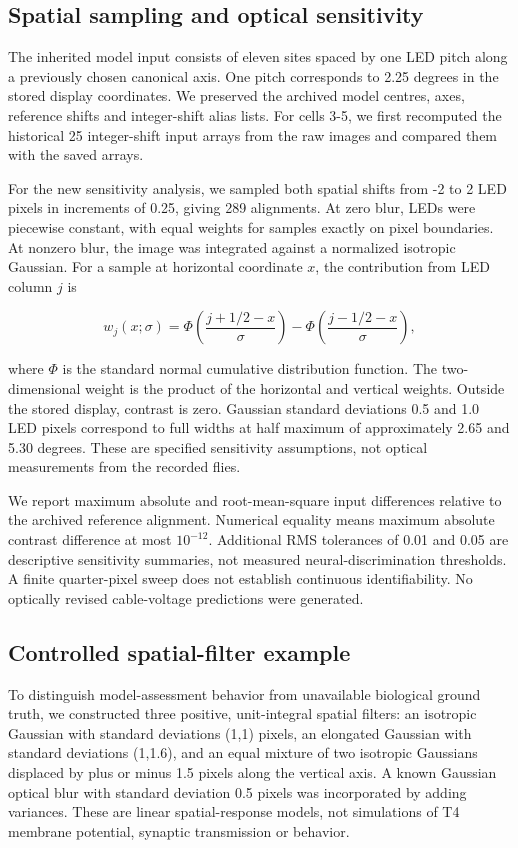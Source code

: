 \documentclass[11pt,letterpaper]{article}
\begin{document}
\subsection{Spatial sampling and optical sensitivity}

The inherited model input consists of eleven sites spaced by one LED pitch along a previously chosen canonical axis. One pitch corresponds to 2.25 degrees in the stored display coordinates. We preserved the archived model centres, axes, reference shifts and integer-shift alias lists. For cells 3-5, we first recomputed the historical 25 integer-shift input arrays from the raw images and compared them with the saved arrays.


For the new sensitivity analysis, we sampled both spatial shifts from -2 to 2 LED pixels in increments of 0.25, giving 289 alignments. At zero blur, LEDs were piecewise constant, with equal weights for samples exactly on pixel boundaries. At nonzero blur, the image was integrated against a normalized isotropic Gaussian. For a sample at horizontal coordinate $x$, the contribution from LED column $j$ is


\[
w_j(x;\sigma)=\Phi\!\left(\frac{j+1/2-x}{\sigma}\right)-\Phi\!\left(\frac{j-1/2-x}{\sigma}\right),
\]

where $\Phi$ is the standard normal cumulative distribution function. The two-dimensional weight is the product of the horizontal and vertical weights. Outside the stored display, contrast is zero. Gaussian standard deviations 0.5 and 1.0 LED pixels correspond to full widths at half maximum of approximately 2.65 and 5.30 degrees. These are specified sensitivity assumptions, not optical measurements from the recorded flies.


We report maximum absolute and root-mean-square input differences relative to the archived reference alignment. Numerical equality means maximum absolute contrast difference at most $10^{-12}$. Additional RMS tolerances of 0.01 and 0.05 are descriptive sensitivity summaries, not measured neural-discrimination thresholds. A finite quarter-pixel sweep does not establish continuous identifiability. No optically revised cable-voltage predictions were generated.


\subsection{Controlled spatial-filter example}

To distinguish model-assessment behavior from unavailable biological ground truth, we constructed three positive, unit-integral spatial filters: an isotropic Gaussian with standard deviations (1,1) pixels, an elongated Gaussian with standard deviations (1,1.6), and an equal mixture of two isotropic Gaussians displaced by plus or minus 1.5 pixels along the vertical axis. A known Gaussian optical blur with standard deviation 0.5 pixels was incorporated by adding variances. These are linear spatial-response models, not simulations of T4 membrane potential, synaptic transmission or behavior.
\end{document}
